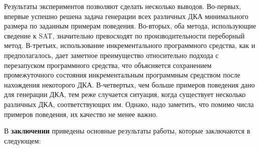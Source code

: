 Результаты экспериментов позволяют сделать несколько выводов.
Во-первых, впервые успешно решена задача генерации всех различных ДКА минимального размера по заданным примерам поведения.
Во-вторых, оба метода, использующие сведение к SAT, значительно превосходят по производительности переборный метод.
В-третьих, использование инкрементального программного средства, как и предполагалось, дает заметное преимущество относительно подхода с перезапуском программного средства, что объясняется сохранением промежуточного состояния инкрементальным программным средством после нахождения некоторого ДКА.
В-четвертых, чем больше примеров поведения дано для генерации ДКА, тем реже случается ситуация, когда существует несколько различных ДКА, соответствующих им.
Однако, надо заметить, что помимо числа примеров поведения, их качество не менее важно.



В \textbf{заключении} приведены основные результаты работы, которые заключаются в следующем:

